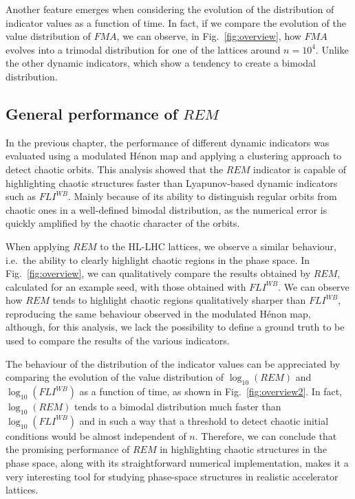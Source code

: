 Another feature emerges when considering the evolution of the distribution of indicator values as a function of time. In fact, if we compare the evolution of the value distribution of $FMA$, we can observe, in Fig.~\ref{fig:overview}, how $FMA$ evolves into a trimodal distribution for one of the lattices around $n=10^4$. Unlike the other dynamic indicators, which show a tendency to create a bimodal distribution.

\subsection{General performance of $REM$}

In the previous chapter, the performance of different dynamic indicators was evaluated using a modulated Hénon map and applying a clustering approach to detect chaotic orbits. This analysis showed that the $REM$ indicator is capable of highlighting chaotic structures faster than Lyapunov-based dynamic indicators such as $FLI^{WB}$. Mainly because of its ability to distinguish regular orbits from chaotic ones in a well-defined bimodal distribution, as the numerical error is quickly amplified by the chaotic character of the orbits.

When applying $REM$ to the HL-LHC lattices, we observe a similar behaviour, i.e.\ the ability to clearly highlight chaotic regions in the phase space. In Fig.~\ref{fig:overview}, we can qualitatively compare the results obtained by $REM$, calculated for an example seed, with those obtained with $FLI^{WB}$. We can observe how $REM$ tends to highlight chaotic regions qualitatively sharper than $FLI^{WB}$, reproducing the same behaviour observed in the modulated Hénon map, although, for this analysis, we lack the possibility to define a ground truth to be used to compare the results of the various indicators.

The behaviour of the distribution of the indicator values can be appreciated by comparing the evolution of the value distribution of $\log_{10}(REM)$ and $\log_{10}(FLI^{WB})$ as a function of time, as shown in Fig.~\ref{fig:overview2}. In fact, $\log_{10}(REM)$ tends to a bimodal distribution much faster than $\log_{10}(FLI^{WB})$ and in such a way that a threshold to detect chaotic initial conditions would be almost independent of $n$. Therefore, we can conclude that the promising performance of $REM$ in highlighting chaotic structures in the phase space, along with its straightforward numerical implementation, makes it a very interesting tool for studying phase-space structures in realistic accelerator lattices.

